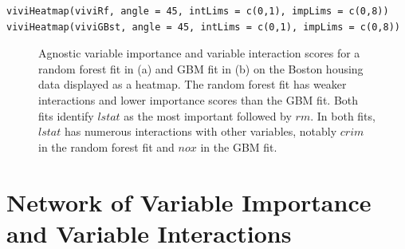 \begin{verbatim}
viviHeatmap(viviRf, angle = 45, intLims = c(0,1), impLims = c(0,8))
viviHeatmap(viviGBst, angle = 45, intLims = c(0,1), impLims = c(0,8))
\end{verbatim}

\begin{figure}

{\centering {}

}

\caption{Agnostic variable importance and variable interaction scores for a random forest fit in (a) and GBM fit in (b) on the Boston housing data displayed as a heatmap. The random forest fit has weaker interactions and lower importance scores than the GBM fit. Both fits identify $lstat$ as the most important followed by $rm$. In both fits, $lstat$ has numerous interactions with other variables, notably $crim$ in the random forest fit and $nox$ in the GBM fit.}\label{fig:heatmaps}
\end{figure}

\hypertarget{networkSec}{%
\section{Network of Variable Importance and Variable Interactions}\label{networkSec}}

